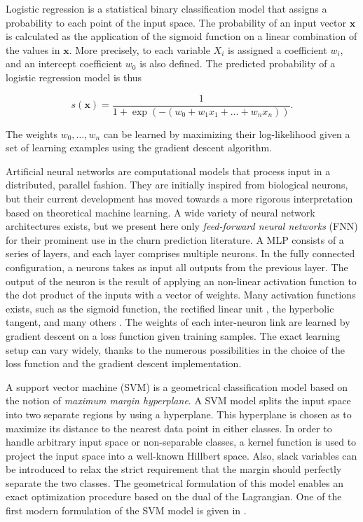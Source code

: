 Logistic regression is a statistical binary classification model that assigns a
probability to each point of the input space. The probability of an input vector
$\bm x$ is calculated as the application of the sigmoid function on a linear
combination of the values in $\bm x$. More precisely, to each variable $X_i$ is
assigned a coefficient $w_i$, and an intercept coefficient $w_0$ is also
defined. The predicted probability of a logistic regression model is thus

\begin{equation*}
    s(\bm x) = \frac{1}{1+\exp{(-(w_0 + w_1x_1 + \dots + w_nx_n))}}.
\end{equation*}

The weights $w_0,\dots,w_n$ can be learned by maximizing their log-likelihood
given a set of learning examples using the gradient descent algorithm.

Artificial neural networks are computational models that process input in a
distributed, parallel fashion. They are initially inspired from biological
neurons, but their current development has moved towards a more rigorous
interpretation based on theoretical machine learning. A wide variety of neural
network architectures exists, but we present here only \emph{feed-forward neural
networks} (FNN) for their prominent use in the churn prediction literature. A
MLP consists of a series of layers, and each layer comprises multiple neurons.
In the fully connected configuration, a neurons takes as input all outputs from
the previous layer. The output of the neuron is the result of applying an
non-linear activation function to the dot product of the inputs with a vector of
weights. Many  activation functions exists, such as the sigmoid function, the
rectified linear unit \parencite{nair2010rectified}, the hyperbolic tangent, and
many others \parencite{cheng1994neural}. The weights of each inter-neuron link
are learned by gradient descent on a loss function given training samples. The
exact learning setup can vary widely, thanks to the numerous possibilities in
the choice of the loss function and the gradient descent implementation.

A support vector machine (SVM) is a geometrical classification model based on
the notion of \emph{maximum margin hyperplane}. A SVM model splits the input
space into two separate regions by using a hyperplane. This hyperplane is chosen
as to maximize its distance to the nearest data point in either classes. In
order to handle arbitrary input space or non-separable classes, a kernel
function is used to project the input space into a well-known Hillbert space.
Also, slack variables can be introduced to relax the strict requirement that the
margin should perfectly separate the two classes. The geometrical formulation of
this model enables an exact optimization procedure based on the dual of the
Lagrangian. One of the first modern formulation of the SVM model is given in
\parencite{boser1992training}.

